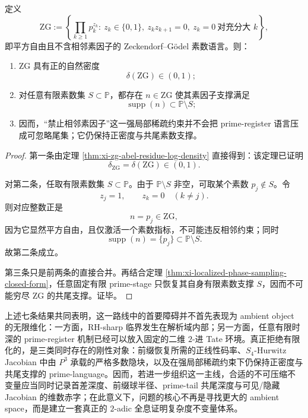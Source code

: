 \begin{theorem}\label{thm:xi-time-part9w-zg-positive-density-cofinal-tail}
定义
\[
\mathrm{ZG}
:=
\left\{
\prod_{k\ge 1}p_k^{z_k}:\ 
z_k\in\{0,1\},\ 
z_kz_{k+1}=0,\ 
z_k=0\ \text{对充分大 }k
\right\},
\]
即平方自由且不含相邻素因子的 Zeckendorf--G\"odel 素数语言。则：
\begin{enumerate}
  \item \(\mathrm{ZG}\) 具有正的自然密度
  \[
  \delta(\mathrm{ZG})\in(0,1);
  \]
  \item 对任意有限素数集 \(S\subset\mathbb P\)，都存在 \(n\in \mathrm{ZG}\) 使其素因子支撑满足
  \[
  \operatorname{supp}(n)\subset \mathbb P\setminus S;
  \]
  \item 因而，“禁止相邻素因子”这一强局部稀疏约束并不会把 prime-register 语言压成可忽略尾集；它仍保持正密度与共尾素数支撑。
\end{enumerate}
\end{theorem}
\begin{proof}
第一条由定理 \ref{thm:xi-zg-abel-residue-log-density} 直接得到：该定理已证明
\[
\delta_{\mathrm{ZG}}=\delta(\mathrm{ZG})\in(0,1).
\]

对第二条，任取有限素数集 \(S\subset\mathbb P\)。由于 \(\mathbb P\setminus S\) 非空，可取某个素数 \(p_j\notin S\)。令
\[
z_j=1,
\qquad
z_k=0\quad (k\neq j).
\]
则对应整数正是
\[
n=p_j\in \mathrm{ZG},
\]
因为它显然平方自由，且仅激活一个素数指标，不可能违反相邻约束；同时
\[
\operatorname{supp}(n)=\{p_j\}\subset \mathbb P\setminus S.
\]
故第二条成立。

第三条只是前两条的直接合并。再结合定理 \ref{thm:xi-localized-phase-sampling-closed-form}，任意固定有限 prime-stage 只恢复其自身有限素数支撑 \(S\)，因而不可能穷尽 \(\mathrm{ZG}\) 的共尾支撑。证毕。
\end{proof}

\noindent
上述七条结果共同表明，这一路线中的首要障碍并不首先表现为 ambient object 的无限维化：一方面，RH-sharp 临界发生在解析域内部；另一方面，任意有限时深的 prime-register 机制已经可以放入固定的二维 \(2\)-进 Tate 环境。真正拒绝有限化的，是三类同时存在的刚性对象：前缀恢复所需的正线性码率、\(S_4\)-Hurwitz Jacobian 中由 \(P^3\) 承载的严格多数隐块，以及在强局部稀疏约束下仍保持正密度与共尾支撑的 prime-language。因而，若进一步组织这一主线，合适的不可压缩不变量应当同时记录首差深度、前缀球半径、prime-tail 共尾深度与可见/隐藏 Jacobian 的维数赤字；在此意义下，问题的核心不再是寻找更大的 ambient space，而是建立一套真正的 \(2\)-adic 全息证明复杂度不变量体系。

\endinput
